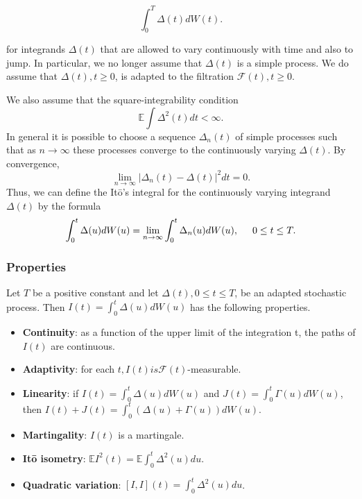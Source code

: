 \documentclass[paper=a4, fontsize=12pt]{scrartcl} %
\numberwithin{equation}{section}
\begin{document}
		\begin{equation}
			\int_0^T \Delta(t) dW(t).
		\end{equation}

for integrands $\Delta(t)$ that are allowed to vary continuously with time and also to jump. In particular, we no longer assume that $\Delta(t)$ is a simple process. We do assume that $\Delta(t), t \geq 0$, is adapted to the filtration $\mathcal{F}(t), t \geq 0$. \par
We also assume that the square-integrability condition
		\begin{equation}
			\mathbb{E} \int \Delta^2(t)dt < \infty.
		\end{equation}
In general it is possible to choose a sequence $\Delta_n(t)$ of simple processes such that as $n \rightarrow \infty$ these processes converge to the continuously varying $\Delta(t)$. By convergence, 
	\begin{equation}
		\lim_{n \to \infty} |\Delta_n(t) - \Delta(t)|^2 dt = 0.
	\end{equation}
Thus, we can define the It\={o}'s integral for the continuously varying integrand $\Delta(t)$ by the formula
	\begin{equation}
		\int_0^t \Delta(u) dW(u) = \lim_{n \to \infty} \int_0^t \Delta_n(u) dW(u), \hspace{0.5cm}0 \leq t \leq T. 
	\end{equation}


\subsubsection{Properties}
Let $T$ be a positive constant and let $\Delta(t), 0 \leq t \leq T$, be an adapted stochastic process. Then $I(t) = \int_0^t \Delta(u) dW(u)$ has the following properties.
	\begin{itemize}
		\item \textbf{Continuity}: as a function of the upper limit of the integration t, the paths of $I(t)$ are continuous.
		\item \textbf{Adaptivity}: for each $t, I(t) is \mathcal{F}(t)$-measurable.
		\item \textbf{Linearity}: if $I(t) = \int_0^t \Delta(u) dW(u)$ and $J(t) = \int_0^t \Gamma(u)dW(u)$, then $I(t)+J(t) = \int_0^t (\Delta(u) + \Gamma(u)) dW(u)$.
		\item \textbf{Martingality}: $I(t)$ is a martingale.
		\item \textbf{It\={o} isometry}: $\mathbb{E}I^2(t) = \mathbb{E} \int_0^t \Delta^2(u) du$.
		\item \textbf{Quadratic variation}: $[I,I](t) = \int_0^t\Delta^2(u)du$.
	\end{itemize}
\end{document}

